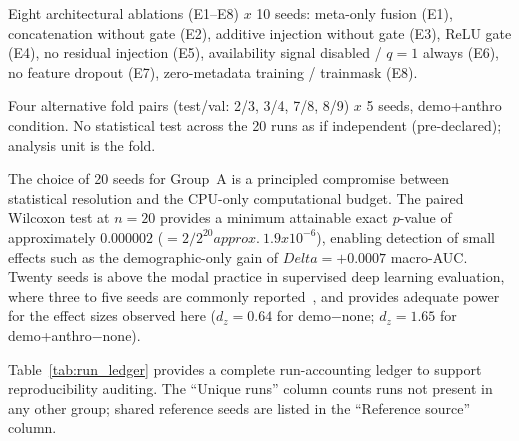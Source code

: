 \documentclass[mathematics,article,submit,pdftex]{Definitions/mdpi}
\def\texttt#1{#1}%
\def\mathrm#1{#1}%
\def\textbf#1{#1}%
\def\Delta{Delta }%
\def\times{x}%
\def\approx{approx.\ }%
\begin{document}
{\begin{description}[leftmargin=1.5em, style=sameline, font=\normalfont]
\item[\textbf{Group E} (exploratory, 80 runs).] Eight architectural ablations (E1--E8) $\times$ 10 seeds: meta-only fusion (E1), concatenation without gate (E2), additive injection without gate (E3), ReLU gate (E4), no residual injection (E5), availability signal disabled / $q{=}1$ always (E6), no feature dropout (E7), zero-metadata training / \texttt{trainmask} (E8).
\item[\textbf{Group F} (multi-split absolute-performance check, 20 runs).] Four alternative fold pairs (test/val: 2/3, 3/4, 7/8, 8/9) $\times$ 5 seeds, \texttt{demo+anthro} condition. No statistical test across the 20 runs as if independent (pre-declared); analysis unit is the fold.
\end{description}}%

The choice of 20 seeds for Group~A is a principled compromise between statistical resolution and the CPU-only computational budget. The paired Wilcoxon test at $n{=}20$ provides a minimum attainable exact $p$-value of approximately $0.000002$ ($= 2/2^{20} \approx 1.9\times10^{-6}$), enabling detection of small effects such as the demographic-only gain of $\Delta{=}+0.0007$ macro-AUC. Twenty seeds is above the modal practice in supervised deep learning evaluation, where three to five seeds are commonly reported~\cite{Bouthillier2021,Dodge2019}, and provides adequate power for the effect sizes observed here ($d_{\mathrm{z}}{=}0.64$ for \texttt{demo}$-$\texttt{none}; $d_{\mathrm{z}}{=}1.65$ for \texttt{demo+anthro}$-$\texttt{none}).

Table~\ref{tab:run_ledger} provides a complete run-accounting ledger to support reproducibility auditing. The ``Unique runs'' column counts runs not present in any other group; shared reference seeds are listed in the ``Reference source'' column.
\end{document}
